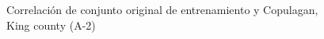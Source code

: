\begin{figure}[H]
    \centering
    
    \caption{Correlación de conjunto original de entrenamiento y Copulagan, King county (A-2)}
    \label{pairwise-king county-a-2-copulagan}
\end{figure}